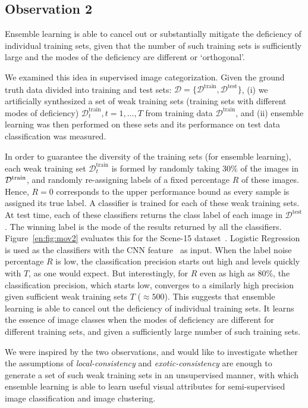 \subsection{Observation 2}
\label{en:sec:mov2}
Ensemble learning is able to cancel out or  substantially mitigate the
deficiency of individual training sets, given that the number of such
training sets is sufficiently large and the modes of the deficiency
are different or `orthogonal'. 

We examined this idea in supervised
image categorization.  Given the ground truth data divided into training
and test sets: $\mathcal D = \{\mathcal{D}^\text{train} ,
\mathcal{D}^\text{test}\}$, (i) we artificially synthesized a set of
weak training sets (training sets with different modes of deficiency)
$\mathcal{D}^\text{train}_t, t=1,\ldots,T$ from training data
$\mathcal{D}^\text{train}$, and (ii) ensemble learning was then
performed on these sets and its performance on test data
classification was measured.

In order to guarantee the diversity of the training sets (for ensemble
learning), each weak training set $\mathcal{D}^\text{train}_t$ is
formed by randomly taking $30\%$ of the images in $\mathcal{D}^\text{train}$, and
randomly re-assigning labels of a fixed percentage $R$ of these
images. Hence, $R=0$ corresponds to the upper performance bound as
every sample is assigned its true label.  A classifier is trained for
each of these weak training sets.  At test time, each of these
classifiers returns the class label of each image in
$\mathcal{D}^\text{test}$. The winning label is the mode of the
results returned by all the classifiers.  Figure~\ref{en:fig:mov2}
evaluates this for the Scene-15
dataset~\citep{scene-15}. Logistic Regression is used as the
classifiers with the CNN feature~\citep{deep:bmvc14} as
input.  When the label noise percentage $R$ is low, the classification
precision starts out high and levels quickly with $T$, as one would
expect. But interestingly, for $R$ even as high as $80\%$, the
classification precision, which starts low, converges to a similarly
high precision given sufficient weak training sets $T$ ($\approx
500$).  This suggests that ensemble learning is able to cancel out the
deficiency of individual training sets. It learns the essence of image
classes when the modes of deficiency are different for different
training sets, and given a sufficiently large number of such training sets.

We were inspired by the two observations, and would like to
investigate whether the assumptions of \emph{local-consis\-tency} and
\emph{exotic-consistency} are enough to generate a set of such weak
training sets in an unsupervised manner, with which ensemble learning
is able to learn useful visual attributes for semi-supervised
image classification and image clustering.

